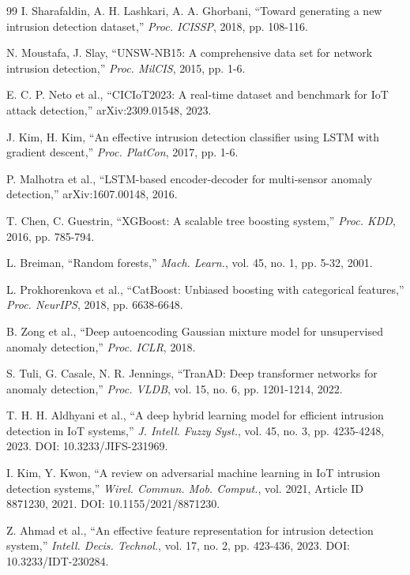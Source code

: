\documentclass[review,12pt]{elsarticle}
\begin{document}
\begin{thebibliography}{99}
I. Sharafaldin, A. H. Lashkari, A. A. Ghorbani, ``Toward generating a new intrusion detection dataset,'' \textit{Proc. ICISSP}, 2018, pp. 108-116.

N. Moustafa, J. Slay, ``UNSW-NB15: A comprehensive data set for network intrusion detection,'' \textit{Proc. MilCIS}, 2015, pp. 1-6.

E. C. P. Neto et al., ``CICIoT2023: A real-time dataset and benchmark for IoT attack detection,'' arXiv:2309.01548, 2023.

J. Kim, H. Kim, ``An effective intrusion detection classifier using LSTM with gradient descent,'' \textit{Proc. PlatCon}, 2017, pp. 1-6.

P. Malhotra et al., ``LSTM-based encoder-decoder for multi-sensor anomaly detection,'' arXiv:1607.00148, 2016.

T. Chen, C. Guestrin, ``XGBoost: A scalable tree boosting system,'' \textit{Proc. KDD}, 2016, pp. 785-794.

L. Breiman, ``Random forests,'' \textit{Mach. Learn.}, vol. 45, no. 1, pp. 5-32, 2001.

L. Prokhorenkova et al., ``CatBoost: Unbiased boosting with categorical features,'' \textit{Proc. NeurIPS}, 2018, pp. 6638-6648.

B. Zong et al., ``Deep autoencoding Gaussian mixture model for unsupervised anomaly detection,'' \textit{Proc. ICLR}, 2018.

S. Tuli, G. Casale, N. R. Jennings, ``TranAD: Deep transformer networks for anomaly detection,'' \textit{Proc. VLDB}, vol. 15, no. 6, pp. 1201-1214, 2022.

T. H. H. Aldhyani et al., ``A deep hybrid learning model for efficient intrusion detection in IoT systems,'' \textit{J. Intell. Fuzzy Syst.}, vol. 45, no. 3, pp. 4235-4248, 2023. DOI: 10.3233/JIFS-231969.

I. Kim, Y. Kwon, ``A review on adversarial machine learning in IoT intrusion detection systems,'' \textit{Wirel. Commun. Mob. Comput.}, vol. 2021, Article ID 8871230, 2021. DOI: 10.1155/2021/8871230.

Z. Ahmad et al., ``An effective feature representation for intrusion detection system,'' \textit{Intell. Decis. Technol.}, vol. 17, no. 2, pp. 423-436, 2023. DOI: 10.3233/IDT-230284.


\end{thebibliography}
\end{document}
